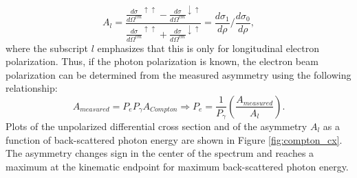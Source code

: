 \begin{equation}
A_{l}=\frac{\frac{d\sigma}{d\Omega^{cm}}^{\uparrow\uparrow}-\frac{d\sigma}{d\Omega^{cm}}^{\downarrow\uparrow}}{\frac{d\sigma}{d\Omega^{cm}}^{\uparrow\uparrow}+\frac{d\sigma}{d\Omega^{cm}}^{\downarrow\uparrow}}=\frac{d\sigma_1}{d\rho}/\frac{d\sigma_0}{d\rho},
\label{eq:compton_asym}
\end{equation}
where the subscript $l$ emphasizes that this is only for longitudinal electron polarization.
Thus, if the photon polarization is known, the electron beam polarization can be determined from the measured asymmetry using the following relationship:
\begin{equation}
A_{measured}=P_eP_{\gamma}A_{Compton}\Longrightarrow P_e=\frac{1}{P_{\gamma}}\left(\frac{A_{measured}}{A_{l}}\right).
\label{eq:compton_pol}
\end{equation}
Plots of the unpolarized differential cross section and of the asymmetry $A_l$ as a function of back-scattered photon energy are shown in Figure \ref{fig:compton_cx}. The asymmetry changes sign in the center of the spectrum and reaches a maximum at the kinematic endpoint for maximum back-scattered photon energy.

